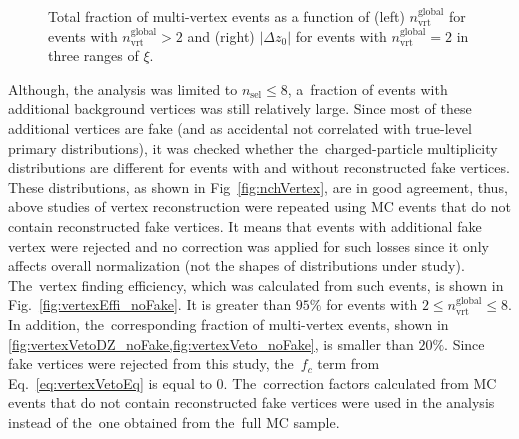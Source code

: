 \begin{figure}[h!]
\begin{subfigure}{.47\textwidth}
	\end{subfigure}
	\caption{Total fraction of multi-vertex events as a function of (left) $n_\textrm{vrt}^\textrm{global}$ for events with $n^\textrm{global}_\textrm{vrt}>2$ and (right) $|\Delta z_0|$ for events with $n^\textrm{global}_\textrm{vrt}=2$  in three ranges of $\xi$.}
	\label{fig:vertexVetoDZ}
\end{figure}
Although, the analysis was limited to $n_\textrm{sel}\leq8$, a~fraction  of events  with additional background vertices was still relatively large.
Since most of these additional vertices are fake (and as accidental not correlated with true-level primary distributions), it was checked whether the~charged-particle multiplicity distributions are different for events with and without reconstructed fake vertices. These distributions, as shown in Fig~\ref{fig:nchVertex}, are in good agreement, thus, above studies of vertex reconstruction were repeated using \ac{MC} events that do not contain reconstructed fake vertices. It means that events with additional fake vertex  were rejected and no correction was applied for such losses  since it only affects overall normalization (not the shapes of distributions under study). The~vertex finding efficiency, which was  calculated from such events, is shown in Fig.~\ref{fig:vertexEffi_noFake}. It is greater than $95\%$ for events with $2 \leq n_\textrm{vrt}^\textrm{global}\leq 8$. 
  In addition, the~corresponding fraction of multi-vertex events, shown in \cref{fig:vertexVetoDZ_noFake,fig:vertexVeto_noFake}, is smaller than $20\%$. Since fake vertices were rejected from this study, the~$f_{c}$ term from Eq.~\eqref{eq:vertexVetoEq} is equal to $0$. The~correction factors calculated from \ac{MC} events that do not contain reconstructed fake vertices  were used in the analysis instead of the~one obtained from the~full \ac{MC} sample.

